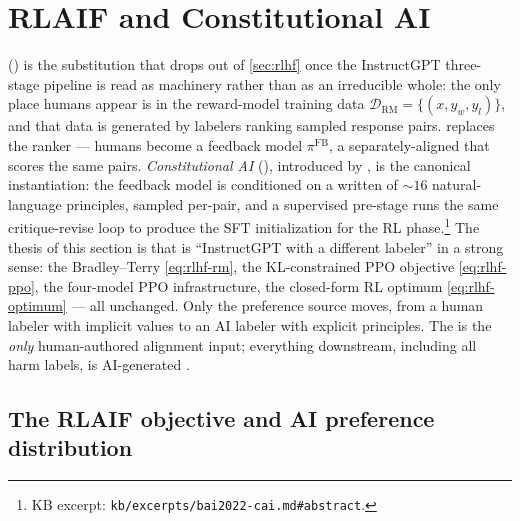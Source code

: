 
\section{RLAIF and Constitutional AI}
\label{sec:rlaif-cai}

 () is the substitution
that drops out of \cref{sec:rlhf} once the InstructGPT three-stage
pipeline is read as machinery rather than as an irreducible whole:
the only place humans appear is in the reward-model training data
$\mathcal{D}_{\mathrm{RM}} = \{(x, y_w, y_l)\}$, and that data is
generated by labelers ranking sampled response pairs.  replaces
the ranker — humans become a feedback model $\pi^{\mathrm{FB}}$, a
separately-aligned  that scores the same pairs. \emph{Constitutional
AI} (), introduced by \citet{bai2022-cai}, is the canonical 
instantiation: the feedback model is conditioned on a written
\emph{} of $\sim\!16$ natural-language principles, sampled
per-pair, and a supervised pre-stage runs the same critique-revise loop
to produce the SFT initialization for the RL phase.\footnote{KB
excerpt: \texttt{kb/excerpts/bai2022-cai.md\#abstract}.} The thesis of
this section is that  is ``InstructGPT with a different labeler''
in a strong sense: the Bradley--Terry 
\cref{eq:rlhf-rm}, the KL-constrained PPO objective \cref{eq:rlhf-ppo},
the four-model PPO infrastructure, the closed-form RL optimum
\cref{eq:rlhf-optimum} — all unchanged. Only the preference source
moves, from a human labeler with implicit values to an AI labeler with
explicit principles. The  is the \emph{only} human-authored
alignment input; everything downstream, including all harm labels, is
AI-generated \citep[\S abstract]{bai2022-cai}.

\subsection{The RLAIF objective and AI preference distribution}
\label{sec:rlaif-objective}


